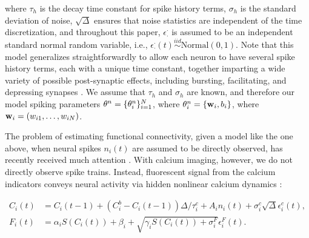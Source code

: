 \noindent where $\tau_h$ is the decay time constant for spike history terms, $\sigma_h$ is the standard deviation of noise, $\sqrt{\Delta}$ ensures that noise statistics are independent of the time discretization, and throughout this paper, $\epsilon_\cdot^\cdot$ is assumed to be an independent standard normal random variable, i.e., $\epsilon_{\cdot}^{\cdot}(t) \overset{iid}{\sim} \text{Normal}(0,1)$.  Note that this model generalizes straightforwardly to allow each neuron to have several spike history terms, each with a unique time constant, together imparting a wide variety of possible post-synaptic effects, including bursting, facilitating, and depressing synapses \cite{PAN03d}.  We assume that $\tau_h$ and $\sigma_h$ are known, and therefore our model spiking parameters $\mathbf{\theta}^n=\{\mathbf{\theta}^n_i\}_{i=1}^N$, where $\mathbf{\theta}^n_i=\{\mathbf{w}_i,b_i\}$, where $\mathbf{w}_i=(w_{i1},\ldots, w_{iN})$.
%


The problem of estimating functional connectivity, given a model like the one above, when neural spikes $n_i(t)$ are assumed to be directly observed, has recently received much attention \cite{PILL07}. With calcium imaging, however, we do not directly observe spike trains. Instead, fluorescent signal from the calcium indicators conveys neural activity via hidden nonlinear calcium dynamics \cite{Vogelstein2009}: 

\begin{align} \label{eqn:ca:definition} %
C_i(t) &= C_i(t-1) + (C_i^b-C_i(t-1)) \Delta/\tau^c_i + A_i n_i(t)+\sigma^c_i \sqrt{\Delta} \epsilon^c_i(t), \\
F_i(t) &= \alpha_i S(C_i(t)) + \beta_i + \sqrt{\gamma_i S(C_i(t)) + \sigma^F_i} \epsilon^F_i(t). \label{eqn:F:definition}
\end{align}

